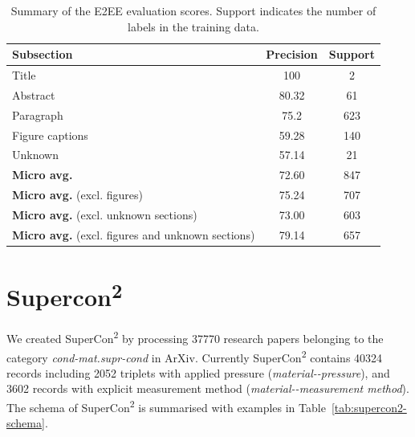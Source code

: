 \begin{table}[ht]
    \centering
    \caption{Summary of the E2EE evaluation scores. Support indicates the number of labels in the training data.}
    \begin{tabular}{l c c}
        \toprule
        \textbf{Subsection}                                      & \textbf{Precision} & \textbf{Support} \\
        \midrule
        Title                                                    & 100                & 2                \\
        Abstract                                                 & 80.32              & 61               \\
        Paragraph                                                & 75.2               & 623              \\
        Figure captions                                          & 59.28              & 140              \\
        Unknown                                                  & 57.14              & 21               \\
        \midrule
        \textbf{Micro avg.}                                      & 72.60              & 847              \\
        \textbf{Micro avg.} (excl. figures)                      & 75.24              & 707              \\
        \textbf{Micro avg.} (excl. unknown sections)             & 73.00              & 603              \\
        \textbf{Micro avg.} (excl. figures and unknown sections) & 79.14              & 657              \\
        \bottomrule
    \end{tabular}
    
    \label{table:end2end-evaluation-summary}
\end{table}


\section{Supercon\textsuperscript{2}}

We created SuperCon\textsuperscript{2} by processing 37770 research papers belonging to the category \textit{cond-mat.supr-cond} in ArXiv.
Currently SuperCon\textsuperscript{2} contains 40324 records including 2052 triplets with applied pressure (\textit{material-\tc-pressure}), and 3602 records with explicit measurement method (\textit{material-\tc-measurement method}).
The schema of SuperCon\textsuperscript{2} is summarised with examples in Table~\ref{tab:supercon2-schema}.

